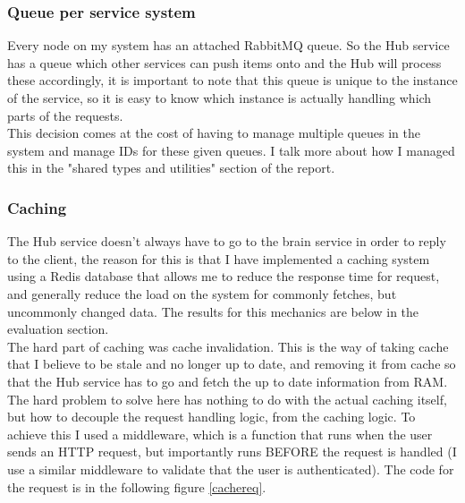 \documentclass[titlepage]{article}
\begin{document}
\subsubsection{Queue per service system}
Every node on my system has an attached RabbitMQ queue. So the Hub service has a queue which other services can push items onto and the Hub will process these accordingly, it is important to note that this queue is unique to the instance of the service, so it is easy to know which instance is actually handling which parts of the requests. \\

This decision comes at the cost of having to manage multiple queues in the system and manage IDs for these given queues. I talk more about how I managed this in the "shared types and utilities" section of the report.

\pagebreak
\subsubsection{Caching}
The Hub service doesn't always have to go to the brain service in order to reply to the client, the reason for this is that I have implemented a caching system using a Redis database that allows me to reduce the response time for request, and generally reduce the load on the system for commonly fetches, but uncommonly changed data. The results for this mechanics are below in the evaluation section. \\

The hard part of caching was cache invalidation. This is the way of taking cache that I believe to be stale and no longer up to date, and removing it from cache so that the Hub service has to go and fetch the up to date information from RAM. \\

The hard problem to solve here has nothing to do with the actual caching itself, but how to decouple the request handling logic, from the caching logic. To achieve this I used a middleware, which is a function that runs when the user sends an HTTP request, but importantly runs BEFORE the request is handled (I use a similar middleware to validate that the user is authenticated). The code for the request is in the following figure \ref{cachereq}.
\end{document}
